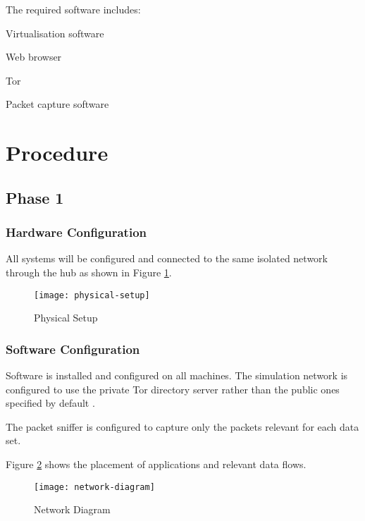 \documentclass{ecuthesis}
\begin{document}
The required software includes:

\begin{itemize*}
  \item Virtualisation software
  \item Web browser
  \item Tor
  \item Packet capture software
\end{itemize*}

\section{Procedure}

\subsection{Phase 1}

\subsubsection{Hardware Configuration}

All systems will be configured and connected to the same isolated network
through the hub as shown in Figure \ref{physical-setup}.

\begin{figure}[H]
  \centering\texttt{[image: physical-setup]}
  \caption{Physical Setup}
  \label{physical-setup}
\end{figure}

\subsubsection{Software Configuration}

Software is installed and configured on all machines. The simulation network is
configured to use the private Tor directory server rather than the public ones
specified by default \parencite{website:private-tor-network}.

The packet sniffer is configured to capture only the packets relevant for each
data set.

Figure \ref{network-diagram} shows the placement of applications and relevant
data flows.

\begin{figure}[H]
  \centering\texttt{[image: network-diagram]}
  \caption{Network Diagram}
  \label{network-diagram}
\end{figure}
\end{document}
